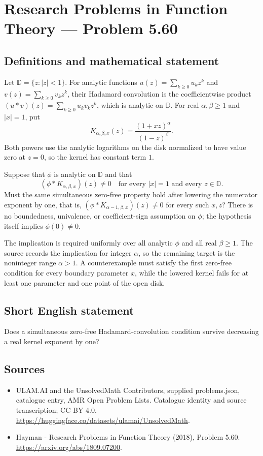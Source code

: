\documentclass[11pt,a4paper]{article}
\begin{document}
\section*{Research Problems in Function Theory — Problem 5.60}\label{statement}

\subsection{Definitions and mathematical statement}
Let $\mathbb D=\{z:|z|<1\}$. For analytic functions
$u(z)=\sum_{k\geq0}u_kz^k$ and $v(z)=\sum_{k\geq0}v_kz^k$,
their Hadamard convolution is the coefficientwise product
$(u*v)(z)=\sum_{k\geq0}u_kv_kz^k$, which is analytic on
$\mathbb D$.
For real $\alpha,\beta\geq1$ and $|x|=1$, put
\[
 K_{\alpha,\beta,x}(z)=
       \frac{(1+xz)^\alpha}{(1-z)^\beta}.
\]
Both powers use the analytic logarithms on the disk normalized
to have value zero at $z=0$, so the kernel has constant term $1$.

Suppose that $\phi$ is analytic on $\mathbb D$ and that
\[
 (\phi*K_{\alpha,\beta,x})(z)\ne0
 \quad\text{for every }|x|=1\text{ and every }z\in\mathbb D.
\]
Must the same simultaneous zero-free property hold after lowering
the numerator exponent by one, that is,
$(\phi*K_{\alpha-1,\beta,x})(z)\ne0$ for every such $x,z$?
There is no boundedness, univalence, or coefficient-sign
assumption on $\phi$; the hypothesis itself implies
$\phi(0)\ne0$.

The implication is required uniformly over all analytic $\phi$
and all real $\beta\geq1$. The source records the implication for
integer $\alpha$, so the remaining target is the noninteger
range $\alpha>1$. A counterexample must satisfy the first
zero-free condition for every boundary parameter $x$, while
the lowered kernel fails for at least one parameter and one
point of the open disk.
\subsection{Short English statement}
Does a simultaneous zero-free Hadamard-convolution condition survive decreasing a real kernel exponent by one?
\subsection{Sources}
\begin{itemize}
\item[S1] ULAM.AI and the UnsolvedMath Contributors, supplied problems.json, catalogue entry, AMR Open Problem Lists. Catalogue identity and source transcription; CC BY 4.0.
\url{https://huggingface.co/datasets/ulamai/UnsolvedMath}.
\item[S2] Hayman - Research Problems in Function Theory (2018), Problem 5.60. 
\url{https://arxiv.org/abs/1809.07200}.
\end{itemize}
\end{document}
